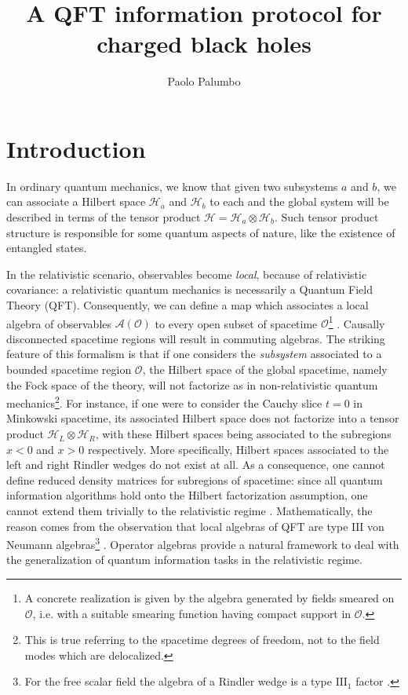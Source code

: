 \documentclass[a4paper,11pt]{article}
\title{\boldmath A QFT information protocol for charged black holes}
\author{Paolo Palumbo}
\affiliation{Dipartimento di Fisica "Ettore Pancini",
Universit\`a degli studi di Napoli Federico II,
Via Cintia, 80126 Napoli, Italy}
\affiliation{INFN, Sezione di Napoli, Complesso Universitario di Monte S. Angelo, Via Cintia Edificio 6, 80126 Napoli, Italy}
\begin{document}
\maketitle
\flushbottom

\section{Introduction}
In ordinary quantum mechanics, we know that given two subsystems $a$ and $b$, we can associate a Hilbert space $\mathcal{H}_a$ and $\mathcal{H}_b$ to each and the global system will be described in terms of the tensor product $\mathcal{H}=\mathcal{H}_a \otimes \mathcal{H}_b$. Such tensor product structure is responsible for some quantum aspects of nature, like the existence of entangled states.

In the relativistic scenario, observables become \textit{local}, because of relativistic covariance: a relativistic quantum mechanics is necessarily a Quantum Field Theory (QFT). Consequently, we can define a map which associates a local algebra of observables $\mathcal{A}(\mathcal{O})$ to every open subset of spacetime $\mathcal{O}$\footnote{A concrete realization is given by the algebra generated by fields smeared on $\mathcal{O}$, i.e. with a suitable smearing function having compact support in $\mathcal{O}$.} \cite{Haag} \cite{Haag-Kastler}. Causally disconnected spacetime regions will result in commuting algebras. The striking feature of this formalism is that if one considers the \textit{subsystem} associated to a bounded spacetime region $\mathcal{O}$, the Hilbert space of the global spacetime, namely the Fock space of the theory, will not factorize as in non-relativistic quantum mechanics\footnote{This is true referring to the spacetime degrees of freedom, not to the field modes which are delocalized.}. For instance, if one were to consider the Cauchy slice $t=0$ in Minkowski spacetime, its associated Hilbert space does not factorize into a tensor product $\mathcal{H}_L \otimes \mathcal{H}_R$, with these Hilbert spaces being associated to the subregions $x<0$ and $x>0$ respectively. More specifically, Hilbert spaces associated to the left and right Rindler wedges do not exist at all. As a consequence, one cannot define reduced density matrices for subregions of spacetime: since all quantum information algorithms hold onto the Hilbert factorization assumption, one cannot extend them trivially to the relativistic regime \cite{Werner}. Mathematically, the reason comes from the observation that local algebras of QFT are type $\mathrm{III}$ von Neumann algebras\footnote{For the free scalar field the algebra of a Rindler wedge is a type $\mathrm{III}_1$ factor \cite{Connes1}.} \cite{Araki}. Operator algebras provide a natural framework to deal with the generalization of quantum information tasks in the relativistic regime.
\end{document}
